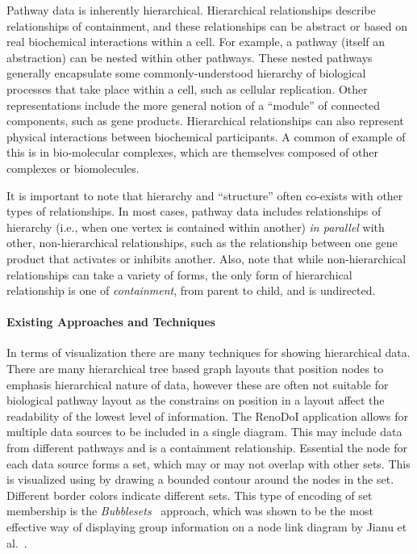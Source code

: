 Pathway data is inherently hierarchical.
Hierarchical relationships describe relationships of containment, and these relationships can be abstract or based on real biochemical interactions within a cell.
For example, a pathway (itself an abstraction) can be nested within other pathways.
These nested pathways generally encapsulate some commonly-understood hierarchy of biological processes that take place within a cell, such as cellular replication.
Other representations include the more general notion of a ``module'' of connected components, such as gene products.
Hierarchical relationships can also represent physical interactions between biochemical participants.
A common of example of this is in bio-molecular complexes, which are themselves composed of other complexes or biomolecules.

It is important to note that hierarchy and ``structure'' often co-exists with other types of relationships. In most cases, pathway data includes relationships of hierarchy (i.e., when one vertex is contained within another) \textit{in parallel} with other, non-hierarchical relationships, such as the relationship between one gene product that activates or inhibits another. Also, note that while non-hierarchical relationships can take a variety of forms, the only form of hierarchical relationship is one of \textit{containment}, from parent to child, and is undirected.

\paragraph{Existing Approaches and Techniques}

In terms of visualization there are many techniques for showing hierarchical data.
There are many hierarchical tree based graph layouts that position nodes to emphasis hierarchical nature of data, however these are often not suitable for biological pathway layout as the constrains on position in a layout affect the readability of the lowest level of information.
The RenoDoI application allows for multiple data sources to be included in a single diagram.
This may include data from different pathways and is a containment relationship. Essential the node for each data source forms a set, which may or may not overlap with other sets.
This is visualized using by drawing a bounded contour around the nodes in the set. Different border colors indicate different sets.
This type of encoding of  set membership is the \textit{Bubblesets}~\cite{Collins2009} approach, which was shown to be the most effective way of displaying group information on a node link diagram by Jianu et al.~\cite{Jianu2014}.


